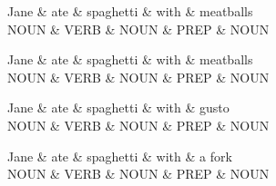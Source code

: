 \documentclass{article}
\begin{document}
    \begin{dependency}[theme=simple]
        \begin{deptext}
			Jane \& ate \& spaghetti \& with \& meatballs \\
            NOUN \& VERB \& NOUN \& PREP \& NOUN \\
        \end{deptext}
    \end{dependency}

    \begin{dependency}[theme=simple]
        \begin{deptext}
			Jane \& ate \& spaghetti \& with \& meatballs \\
            NOUN \& VERB \& NOUN \& PREP \& NOUN \\
        \end{deptext}
    \end{dependency}
    
        \begin{dependency}[theme=simple]
        \begin{deptext}
			Jane \& ate \& spaghetti \& with \& gusto \\
            NOUN \& VERB \& NOUN \& PREP \& NOUN \\
        \end{deptext}
    \end{dependency}

    \begin{dependency}[theme=simple]
        \begin{deptext}
			Jane \& ate \& spaghetti \& with \& a fork \\
            NOUN \& VERB \& NOUN \& PREP \& NOUN \\
        \end{deptext}
    \end{dependency}
\end{document}
